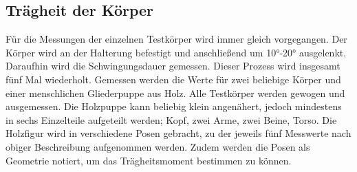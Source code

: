 \subsection{Trägheit der Körper}
Für die Messungen der einzelnen Testkörper wird immer gleich vorgegangen. Der Körper wird an der Halterung befestigt und anschließend um \ang{10;;}-\ang{20;;} ausgelenkt.
Daraufhin wird die Schwingungsdauer gemessen. Dieser Prozess wird insgesamt fünf Mal wiederholt. Gemessen werden die Werte für zwei beliebige Körper und einer menschlichen 
Gliederpuppe aus Holz. Alle Testkörper werden gewogen und ausgemessen. Die Holzpuppe kann beliebig klein angenähert, jedoch mindestens in sechs Einzelteile aufgeteilt werden;
Kopf, zwei Arme, zwei Beine, Torso. Die Holzfigur wird in verschiedene Posen gebracht, zu der jeweils fünf Messwerte nach obiger Beschreibung aufgenommen werden.
Zudem werden die Posen als Geometrie notiert, um das Trägheitsmoment bestimmen zu können.
